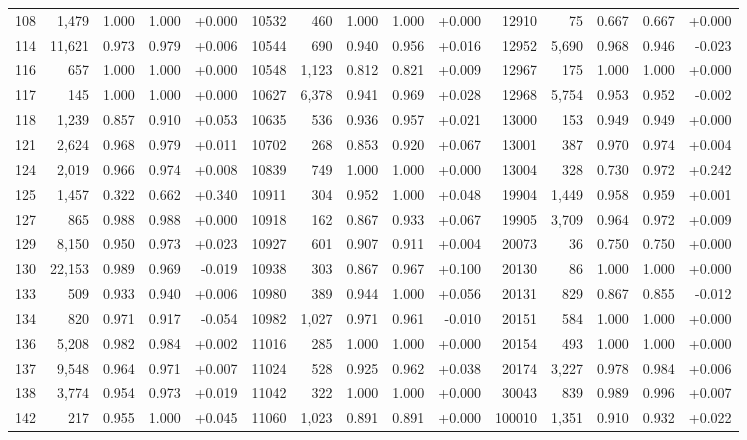 \begin{longtable}{@{}rrrrr@{\hspace{1.5em}}rrrrr@{\hspace{1.5em}}rrrrr@{}}
108 & 1,479 & 1.000 & 1.000 & +0.000 & 10532 & 460 & 1.000 & 1.000 & +0.000 & 12910 & 75 & 0.667 & 0.667 & +0.000\\
114 & 11,621 & 0.973 & 0.979 & +0.006 & 10544 & 690 & 0.940 & 0.956 & +0.016 & 12952 & 5,690 & 0.968 & 0.946 & -0.023\\
116 & 657 & 1.000 & 1.000 & +0.000 & 10548 & 1,123 & 0.812 & 0.821 & +0.009 & 12967 & 175 & 1.000 & 1.000 & +0.000\\
117 & 145 & 1.000 & 1.000 & +0.000 & 10627 & 6,378 & 0.941 & 0.969 & +0.028 & 12968 & 5,754 & 0.953 & 0.952 & -0.002\\
118 & 1,239 & 0.857 & 0.910 & +0.053 & 10635 & 536 & 0.936 & 0.957 & +0.021 & 13000 & 153 & 0.949 & 0.949 & +0.000\\
121 & 2,624 & 0.968 & 0.979 & +0.011 & 10702 & 268 & 0.853 & 0.920 & +0.067 & 13001 & 387 & 0.970 & 0.974 & +0.004\\
124 & 2,019 & 0.966 & 0.974 & +0.008 & 10839 & 749 & 1.000 & 1.000 & +0.000 & 13004 & 328 & 0.730 & 0.972 & +0.242\\
125 & 1,457 & 0.322 & 0.662 & +0.340 & 10911 & 304 & 0.952 & 1.000 & +0.048 & 19904 & 1,449 & 0.958 & 0.959 & +0.001\\
127 & 865 & 0.988 & 0.988 & +0.000 & 10918 & 162 & 0.867 & 0.933 & +0.067 & 19905 & 3,709 & 0.964 & 0.972 & +0.009\\
129 & 8,150 & 0.950 & 0.973 & +0.023 & 10927 & 601 & 0.907 & 0.911 & +0.004 & 20073 & 36 & 0.750 & 0.750 & +0.000\\
130 & 22,153 & 0.989 & 0.969 & -0.019 & 10938 & 303 & 0.867 & 0.967 & +0.100 & 20130 & 86 & 1.000 & 1.000 & +0.000\\
133 & 509 & 0.933 & 0.940 & +0.006 & 10980 & 389 & 0.944 & 1.000 & +0.056 & 20131 & 829 & 0.867 & 0.855 & -0.012\\
134 & 820 & 0.971 & 0.917 & -0.054 & 10982 & 1,027 & 0.971 & 0.961 & -0.010 & 20151 & 584 & 1.000 & 1.000 & +0.000\\
136 & 5,208 & 0.982 & 0.984 & +0.002 & 11016 & 285 & 1.000 & 1.000 & +0.000 & 20154 & 493 & 1.000 & 1.000 & +0.000\\
137 & 9,548 & 0.964 & 0.971 & +0.007 & 11024 & 528 & 0.925 & 0.962 & +0.038 & 20174 & 3,227 & 0.978 & 0.984 & +0.006\\
138 & 3,774 & 0.954 & 0.973 & +0.019 & 11042 & 322 & 1.000 & 1.000 & +0.000 & 30043 & 839 & 0.989 & 0.996 & +0.007\\
142 & 217 & 0.955 & 1.000 & +0.045 & 11060 & 1,023 & 0.891 & 0.891 & +0.000 & 100010 & 1,351 & 0.910 & 0.932 & +0.022\\

\end{longtable}

